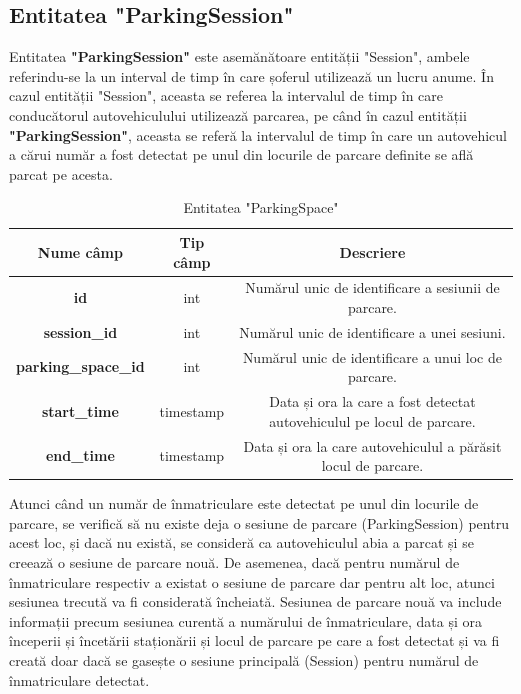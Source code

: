 \documentclass[12pt]{article}
\begin{document}
\subsection{Entitatea "ParkingSession"}

Entitatea \textbf{"ParkingSession"} este asem\u{a}n\u{a}toare entit\u{a}ții "Session", ambele referindu-se la un interval de timp \^{i}n care șoferul utilizeaz\u{a} un lucru anume. \^{I}n cazul entit\u{a}ții "Session", aceasta se referea la intervalul de timp \^{i}n care conduc\u{a}torul autovehiculului utilizeaz\u{a} parcarea, pe c\^{a}nd \^{i}n cazul entit\u{a}ții \textbf{"ParkingSession"}, aceasta se refer\u{a} la intervalul de timp \^{i}n care un autovehicul a c\u{a}rui num\u{a}r a fost detectat pe unul din locurile de parcare definite se afl\u{a} parcat pe acesta.

\begin{table}[h]
\centering
\begin{tabular}{|c|c|c|}
\hline
\textbf{Nume c\^{a}mp}  & \textbf{Tip c\^{a}mp} & \textbf{Descriere} \\
\hline
\textbf{id} & int & Num\u{a}rul unic de identificare a sesiunii de parcare.  \\
\hline
\textbf{session\_id} & int & Num\u{a}rul unic de identificare a unei sesiuni. \\
\hline
\textbf{parking\_space\_id} & int & Num\u{a}rul unic de identificare a unui loc de parcare.  \\
\hline
\textbf{start\_time} & timestamp & Data și ora la care a fost detectat autovehiculul pe locul de parcare.  \\
\hline
\textbf{end\_time} & timestamp & Data și ora la care autovehiculul a p\u{a}r\u{a}sit locul de parcare. \\
\hline
\end{tabular}
\caption{Entitatea "ParkingSpace"}
\end{table}

Atunci c\^{a}nd un num\u{a}r de \^{i}nmatriculare este detectat pe unul din locurile de parcare, se verific\u{a} s\u{a} nu existe deja o sesiune de parcare (ParkingSession) pentru acest loc, și dac\u{a} nu exist\u{a}, se consider\u{a} ca autovehiculul abia a parcat și se creeaz\u{a} o sesiune de parcare nou\u{a}. De asemenea, dac\u{a} pentru num\u{a}rul de \^{i}nmatriculare respectiv a existat o sesiune de parcare dar pentru alt loc, atunci sesiunea trecut\u{a} va fi considerat\u{a} \^{i}ncheiat\u{a}. Sesiunea de parcare nou\u{a} va include informații precum sesiunea curent\u{a} a num\u{a}rului de \^{i}nmatriculare, data și ora \^{i}nceperii și \^{i}ncet\u{a}rii stațion\u{a}rii și locul de parcare pe care a fost detectat și va fi creat\u{a} doar dac\u{a} se gasește o sesiune principal\u{a} (Session) pentru num\u{a}rul de \^{i}nmatriculare detectat.
\end{document}
